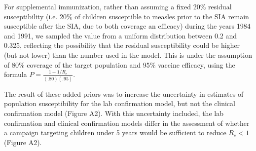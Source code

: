 For supplemental immunization, rather than assuming a fixed 20\% residual susceptibility (i.e. 20\% of children susceptible to measles prior to the SIA remain susceptible after the SIA, due to both coverage an efficacy) during the years 1984 and 1991, we sampled the value from a uniform distribution between 0.2 and 0.325, reflecting the possibility that the residual susceptibility could be higher (but not lower) than the number used in the model. This is under the assumption of 80\% coverage of the target population and 95\% vaccine efficacy, using the formula $P = \frac{1-1/R_e}{(.80)(.95)}$.  

The result of these added priors was to increase the uncertainty in estimates of population susceptibility for the lab confirmation model, but not the clinical confirmation model (Figure A2). With this uncertainty included, the lab confirmation and clinical confirmation models differ in the assessment of whether a campaign targeting children under 5 years would be sufficient to reduce $R_e < 1$ (Figure A2). 